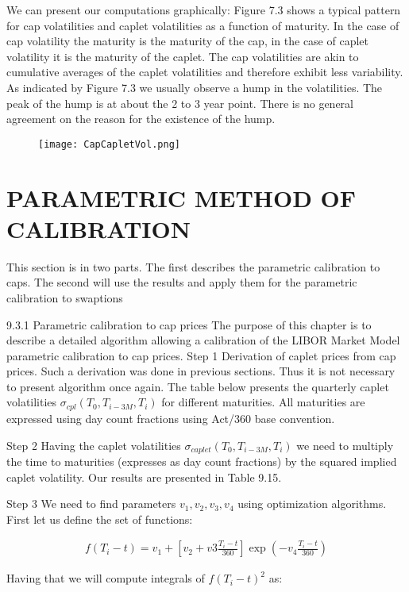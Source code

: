 \documentclass[11pt]{article}
\numberwithin{equation}{subsection}
\begin{document}
We can present our computations graphically:
Figure 7.3 shows a typical pattern for cap volatilities and caplet volatilities as a function
of maturity. In the case of cap volatility the maturity is the maturity of the cap, in the case
of caplet volatility it is the maturity of the caplet. The cap volatilities are akin to cumulative
averages of the caplet volatilities and therefore exhibit less variability. As indicated by
Figure 7.3 we usually observe a hump in the volatilities. The peak of the hump is at about
the 2 to 3 year point. There is no general agreement on the reason for the existence of
the hump.

\begin{figure}[H]
	\texttt{[image: CapCapletVol.png]}
\end{figure}


\section{PARAMETRIC METHOD OF CALIBRATION}
This section is in two parts. The first describes the parametric calibration to caps. The second
will use the results and apply them for the parametric calibration to swaptions


9.3.1 Parametric calibration to cap prices
The purpose of this chapter is to describe a detailed algorithm allowing a calibration of the
LIBOR Market Model parametric calibration to cap prices.
Step 1
Derivation of caplet prices from cap prices.
Such a derivation was done in previous sections. Thus it is not necessary to present algorithm
once again. The table below presents the quarterly caplet volatilities \(\sigma_{cpl}(T_{0}, T_{i-3M}, T_{i})\) for
different maturities. All maturities are expressed using day count fractions using Act/360
base convention.


Step 2
Having the caplet volatilities \(\sigma_{caplet}(T_{0}, T_{i-3M}, T_{i})\) we need to multiply the time to maturities
(expresses as day count fractions) by the squared implied caplet volatility. Our results are
presented in Table 9.15.

Step 3
We need to find parameters \(v_1, v_2, v_3, v_4\) using optimization algorithms. First let us define
the set of functions:

\begin{eqnarray*}
	f(T_i - t) = v_1 + [v_2 + v3 \frac{T_i-t}{360}] \exp(-v_4 \frac{T_i-t}{360})
\end{eqnarray*}

Having that we will compute integrals of \(f(T_i - t)^2\) as:
\end{document}
